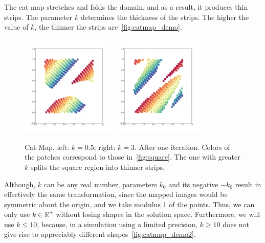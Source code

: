 \documentclass[12pt]{article}
\begin{document}
The cat map stretches and folds the domain, and as a result, it produces thin strips.
The parameter $k$ determines the thickness of the strips.
The higher the value of $k$, the thinner the strips are~\ref{fig:catmap_demo}.
\begin{figure}[t]
  \centering
  \includegraphics[width=0.4\textwidth]{catmap_05}
  \hspace{2cm}
  \includegraphics[width=0.4\textwidth]{catmap_3}
  \caption{Cat Map. left: $k=0.5$; right: $k = 3$. After one iteration. 
    Colors of the patches correspond to those in~\ref{fig:square}.
    The one with greater $k$ splits the square region into thinner strips.
  }
  \label{fig:catmap_demo1}
\end{figure}

Although, $k$ can be any real number, parameters $k_0$ and its negative $-k_0$ result in effectively the same transformation, since the mapped images would be symmetric about the origin, and we take modulus 1 of the points.
Thus, we can only use $k \in \mathbb{R}^+$ without losing shapes in the solution space.
Furthermore, we will use $k \leq 10$, because, in a simulation using a limited precision, $k\geq 10$ does not give rise to appreciably different shapes~\ref{fig:catmap_demo2}.
\end{document}

